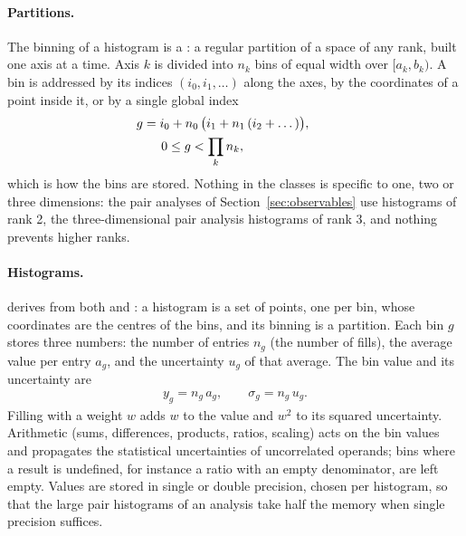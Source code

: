 \paragraph{Partitions.}
The binning of a histogram is a : a regular partition of a space of any rank, built one axis at a
time. Axis $k$ is divided into $n_k$ bins of equal width over $[a_k, b_k)$. A bin is addressed by its indices
$(i_0, i_1, \dots)$ along the axes, by the coordinates of a point inside it, or by a single global index
\begin{align}
  g &= i_0 + n_0\,\bigl(i_1 + n_1\,(i_2 + \dots)\bigr), \qquad \\ \nonumber &\hspace{0.2in} 0 \le g < \prod_k n_k ,
\end{align}
which is how the bins are stored. Nothing in the classes is specific to one, two or three dimensions: the pair
analyses of Section~\ref{sec:observables} use histograms of rank 2, the three-dimensional pair analysis
histograms of rank 3, and nothing prevents higher ranks.

\paragraph{Histograms.}
 derives from both  and : a histogram is a set of points, one per bin,
whose coordinates are the centres of the bins, and its binning is a partition. Each bin $g$ stores three numbers:
the number of entries $n_g$ (the number of fills), the average value per entry $a_g$, and the uncertainty $u_g$ of
that average. The bin value and its uncertainty are
\begin{align}
  y_g = n_g\, a_g, \qquad \sigma_g = n_g\, u_g .
\end{align}
Filling with a weight $w$ adds $w$ to the value and $w^2$ to its squared uncertainty. Arithmetic (sums,
differences, products, ratios, scaling) acts on the bin values and propagates the statistical uncertainties of
uncorrelated operands; bins where a result is undefined, for instance a ratio with an empty denominator, are left empty. Values are stored in single or double precision, chosen per histogram, so that the large pair histograms of an analysis take half the memory when single precision suffices.

